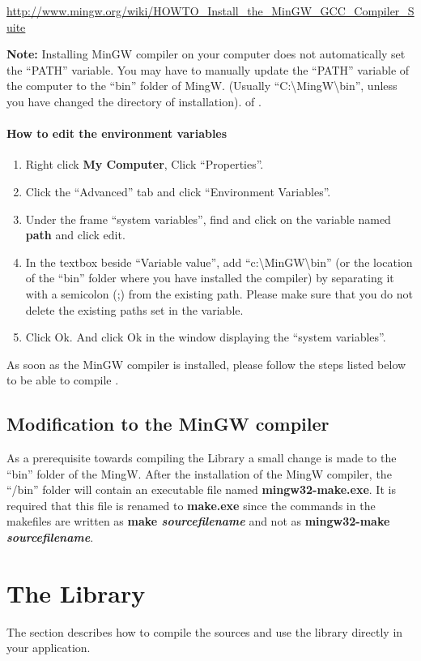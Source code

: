 \url{http://www.mingw.org/wiki/HOWTO_Install_the_MinGW_GCC_Compiler_Suite}

\textbf{Note:} Installing MinGW compiler on your computer does not automatically set the ``PATH'' variable. You may have to manually update the “PATH” variable of the computer to the ``bin'' folder of MingW. (Usually ``C:\textbackslash MingW\textbackslash bin'', unless you have changed the directory of installation). 
of \libalf.
\paragraph{How to edit the environment variables}
\begin{enumerate}
 \item Right click \textbf{My Computer}, Click ``Properties''.
 \item Click the ``Advanced'' tab and click ``Environment Variables''.
 \item Under the frame ``system variables'', find and click on the variable named \textbf{path} and click edit.
 \item In the textbox beside ``Variable value'', add ``c:\textbackslash MinGW\textbackslash bin'' (or the location of the ``bin'' folder where you have installed the compiler) by separating it with a semicolon (;) from the existing path. Please make sure that you do not delete the existing paths set in the variable.
 \item  Click Ok. And click Ok in the window displaying the ``system variables''.
\end{enumerate}
As soon as the MinGW compiler is installed, please follow the steps listed below to be able to compile \libalf.

\subsection*{Modification to the MinGW compiler}

As a prerequisite towards compiling the Library a small change is made to the “bin” folder of the MingW.   
After the installation of the MingW compiler, the ``/bin'' folder will contain an executable file named \textbf{mingw32-make.exe}. It is required that this file is renamed to \textbf{make.exe} since the commands in the makefiles are written as \textbf{make \emph{sourcefilename}} and not as \textbf{mingw32-make \emph{sourcefilename}}.

\section{The \libalf \cpp Library}
The section describes how to compile the sources and use the \cpp library directly in your application.
